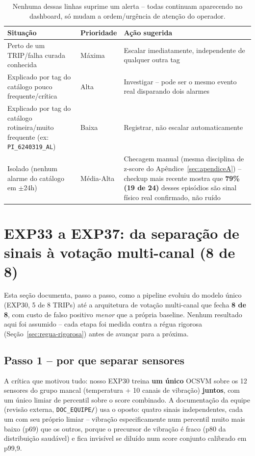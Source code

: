 \documentclass[11pt,a4paper]{article}
\begin{document}
\begin{table}[H]
\centering
\small
\begin{tabular}{p{4.3cm}p{4.3cm}p{5.4cm}}
\toprule
\textbf{Situação} & \textbf{Prioridade} & \textbf{Ação sugerida} \\
\midrule
Perto de um TRIP/falha curada conhecida & Máxima & Escalar imediatamente, independente de qualquer outra tag \\
Explicado por tag do catálogo pouco frequente/crítica & Alta & Investigar -- pode ser o mesmo evento real disparando dois alarmes \\
Explicado por tag do catálogo rotineira/muito frequente (ex: \texttt{PI\_6240319\_AL}) & Baixa & Registrar, não escalar automaticamente \\
Isolado (nenhum alarme do catálogo em $\pm$24h) & Média-Alta & Checagem manual (mesma disciplina de z-score do Apêndice~\ref{sec:apendiceA}) -- checkup mais recente mostra que \textbf{79\% (19 de 24)} desses episódios são sinal físico real confirmado, não ruído \\
\bottomrule
\end{tabular}
\caption{Nenhuma dessas linhas suprime um alerta -- todas continuam
aparecendo no dashboard, só mudam a ordem/urgência de atenção do
operador.}
\end{table}

\section{EXP33 a EXP37: da separação de sinais à votação multi-canal (8 de 8)}
\label{sec:exp37}

Esta seção documenta, passo a passo, como a pipeline evoluiu do modelo
único (EXP30, 5 de 8 TRIPs) até a arquitetura de votação multi-canal
que fecha \textbf{8 de 8}, com custo de falso positivo \emph{menor}
que a própria baseline. Nenhum resultado aqui foi assumido -- cada
etapa foi medida contra a régua rigorosa (Seção~\ref{sec:regua-rigorosa})
antes de avançar para a próxima.

\subsection{Passo 1 -- por que separar sensores}

A crítica que motivou tudo: nosso EXP30 treina \textbf{um único}
OCSVM sobre os 12 sensores do grupo mancal (temperatura + 10 canais de
vibração) \textbf{juntos}, com um único limiar de percentil sobre o
score combinado. A documentação da equipe (revisão externa,
\texttt{DOC\_EQUIPE/}) usa o oposto: quatro sinais independentes, cada
um com seu próprio limiar -- vibração especificamente num percentil
muito mais baixo (p69) que os outros, porque o precursor de vibração é
fraco (p80 da distribuição saudável) e fica invisível se diluído num
score conjunto calibrado em p99,9.
\end{document}
